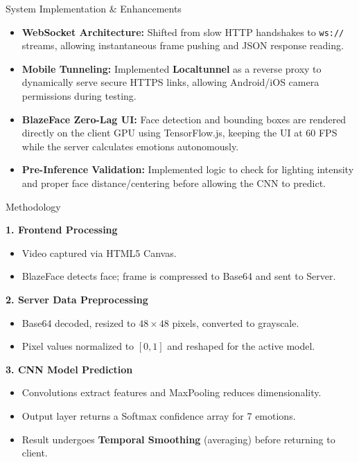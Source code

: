 \documentclass[aspectratio=169]{beamer}
\begin{document}
\begin{frame}{System Implementation \& Enhancements}
\begin{itemize}
    \item \textbf{WebSocket Architecture:} Shifted from slow HTTP handshakes to \texttt{ws://} streams, allowing instantaneous frame pushing and JSON response reading.
    \item \textbf{Mobile Tunneling:} Implemented \textbf{Localtunnel} as a reverse proxy to dynamically serve secure HTTPS links, allowing Android/iOS camera permissions during testing.
    \item \textbf{BlazeFace Zero-Lag UI:} Face detection and bounding boxes are rendered directly on the client GPU using TensorFlow.js, keeping the UI at 60 FPS while the server calculates emotions autonomously.
    \item \textbf{Pre-Inference Validation:} Implemented logic to check for lighting intensity and proper face distance/centering before allowing the CNN to predict.
\end{itemize}
\end{frame}

\begin{frame}{Methodology}

\textbf{1. Frontend Processing}
\begin{itemize}
    \item Video captured via HTML5 Canvas.
    \item BlazeFace detects face; frame is compressed to Base64 and sent to Server.
\end{itemize}

\textbf{2. Server Data Preprocessing}
\begin{itemize}
    \item Base64 decoded, resized to $48\times 48$ pixels, converted to grayscale.
    \item Pixel values normalized to $[0,1]$ and reshaped for the active model.
\end{itemize}

\textbf{3. CNN Model Prediction}
\begin{itemize}
    \item Convolutions extract features and MaxPooling reduces dimensionality.
    \item Output layer returns a Softmax confidence array for 7 emotions.
    \item Result undergoes \textbf{Temporal Smoothing} (averaging) before returning to client.
\end{itemize}
\end{frame}
\end{document}
